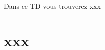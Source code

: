 \documentclass[a4paper,11pt]{article}
\begin{document}
	\logo
	\entete
	\licence
	\lastedit
	\maketitle
	\setcounter{tocdepth}{3}

	Dans ce TD vous trouverez xxx
	\tableofcontents

	\newpage

\section{xxx }
\end{document}
